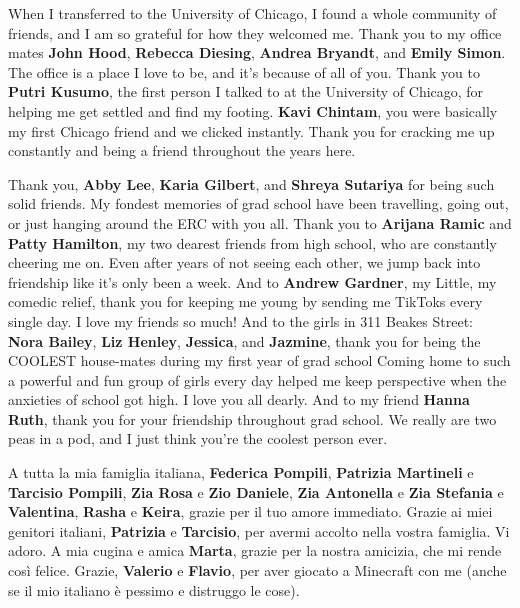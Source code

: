 \documentclass{ucetd}
\begin{document}
When I transferred to the University of Chicago, I found a whole community of friends, and I am so grateful for how they welcomed me.  Thank you to my office mates \textbf{John Hood}, \textbf{Rebecca Diesing}, \textbf{Andrea Bryandt}, and \textbf{Emily Simon}.  The office is a place I love to be, and it's because of all of you.  Thank you to \textbf{Putri Kusumo}, the first person I talked to at the University of Chicago, for helping me get settled and find my footing.  \textbf{Kavi Chintam}, you were basically my first Chicago friend and we clicked instantly.  Thank you for cracking me up constantly and being a friend throughout the years here.

Thank you, \textbf{Abby Lee}, \textbf{Karia Gilbert}, and \textbf{Shreya Sutariya} for being such solid friends.  My fondest memories of grad school have been travelling, going out, or just hanging around the ERC with you all.  Thank you to \textbf{Arijana Ramic} and \textbf{Patty Hamilton}, my two dearest friends from high school, who are constantly cheering me on.  Even after years of not seeing each other, we jump back into friendship like it's only been a week.  And to \textbf{Andrew Gardner}, my Little, my comedic relief, thank you for keeping me young by sending me TikToks every single day.  I love my friends so much!  And to the girls in 311 Beakes Street: \textbf{Nora Bailey}, \textbf{Liz Henley}, \textbf{Jessica}, and \textbf{Jazmine}, thank you for being the COOLEST house-mates during my first year of grad school  Coming home to such a powerful and fun group of girls every day helped me keep perspective when the anxieties of school got high.  I love you all dearly.  And to my friend \textbf{Hanna Ruth}, thank you for your friendship throughout grad school.  We really are two peas in a pod, and I just think you're the coolest person ever.

A tutta la mia famiglia italiana, \textbf{Federica Pompili}, \textbf{Patrizia Martineli} e \textbf{Tarcisio Pompili}, \textbf{Zia Rosa} e \textbf{Zio Daniele}, \textbf{Zia Antonella} e \textbf{Zia Stefania} e \textbf{Valentina}, \textbf{Rasha} e \textbf{Keira}, grazie per il tuo amore immediato.  Grazie ai miei genitori italiani, \textbf{Patrizia} e \textbf{Tarcisio}, per avermi accolto nella vostra famiglia.  Vi adoro.  A mia cugina e amica \textbf{Marta}, grazie per la nostra amicizia, che mi rende così felice.  Grazie, \textbf{Valerio} e \textbf{Flavio}, per aver giocato a Minecraft con me (anche se il mio italiano è pessimo e distruggo le cose).
\end{document}
